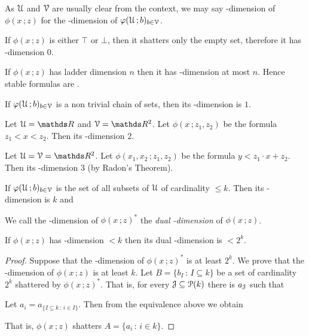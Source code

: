 \documentclass[scombinatorics.tex]{subfiles}
\begin{document}
As $\EuScript U$ and $\EuScript V$ are usually clear from the context, we may say \vc-dimension of $\phi(x\,;z)$ for the \vc-dimension of $\varphi(\EuScript U\,;b)_{b\in\EuScript V}$.

\begin{example}
  If $\phi(x\,;z)$ is either $\top$ or $\bot$, then it shatters only the empty set, therefore it has \vc-dimension $0$.\QED
\end{example}

\begin{example}
  If $\phi(x\,;z)$ has ladder dimension $n$ then it has \vc-dimension at most $n$. Hence stable formulas are \nip.\QED
\end{example}
 
\begin{example}
  If $\varphi(\EuScript U\,;b)_{b\in\EuScript V}$ is a non trivial chain of sets, then its \vc-dimension is $1$.\QED
\end{example}
 
\begin{example} 
  Let $\U=\RR$ and $\V=\RR^2$.
  Let $\phi(x\,;z_1,z_2)$ be the formula $z_1<x<z_2$.
  Then its \vc-dimension $2$.\QED
\end{example}
 
\begin{example} 
  Let $\U=\V=\RR^2$.
  Let $\phi(x_1,x_2\,;z_1,z_2)$ be the formula $y<z_1\cdot x + z_2$.
  Then its  \vc-dimension $3$ (by Radon's Theorem).\QED
\end{example}
 
\begin{example}\label{ex_vcdim_opt}
  If $\varphi(\EuScript U\,;b)_{b\in\EuScript V}$ is the set of all subsets of $\EuScript U$ of cardinality $\le k$.
  Then its \vc-dimension is $k$ and
  
  \QED
\end{example}

We call the \vc-dimension of $\phi(x\,;z)^*$ the \emph{dual \vc-dimension\/} of  $\phi(x\,;z)$.

\begin{proposition}
  If $\phi(x\,;z)$ has \vc-dimension $<k$ then its dual \vc-dimension is $< 2^k$.
\end{proposition}
  
\begin{proof}
  Suppose that the \vc-dimension of $\phi(x\,;z)^*$ is at least $2^k$.
  We prove that the \vc-dimension of $\phi(x\,;z)$ is at least $k$.
  Let $B=\{b_I\,:\,I\subseteq k\}$ be a set of cardinality $2^k$ shattered by $\phi(x\,;z)^*$. 
  That is, for every $\EuScript J\subseteq \EuScript P(k)$ there is $a_\EuScript J$ such that
  
  
  Let $a_i=a_{\{I\subseteq k\,:\, i\in I\}}$. Then from the equivalence above we obtain
  
  
  That is, $\phi(x\,;z)$ shatters $A=\{a_i\,:\, i\in k\}$.
\end{proof}
\end{document}
